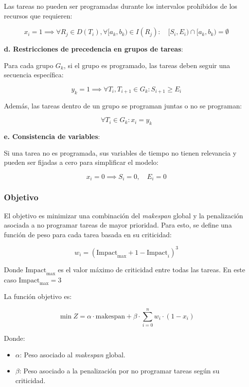 \documentclass{article}
\begin{document}
Las tareas no pueden ser programadas durante los intervalos prohibidos de los recursos que requieren:

\[
x_i = 1 \implies \forall R_j \in D(T_i), \forall [a_k, b_k) \in I(R_j): \quad [S_i, E_i) \cap [a_k, b_k) = \emptyset
\]

\textbf{d. Restricciones de precedencia en grupos de tareas}:

Para cada grupo \( G_k \), si el grupo es programado, las tareas deben seguir una secuencia específica:

\[
y_k = 1 \implies \forall T_i, T_{i+1} \in G_k: S_{i+1} \geq E_i
\]

Además, las tareas dentro de un grupo se programan juntas o no se programan:

\[
\forall T_i \in G_k: x_i = y_k
\]

\textbf{e. Consistencia de variables}:

Si una tarea no es programada, sus variables de tiempo no tienen relevancia y pueden ser fijadas a cero para simplificar el modelo:

\[
x_i = 0 \implies S_i = 0, \quad E_i = 0
\]

\vspace{0.5cm}

\subsubsection{Objetivo}

El objetivo es minimizar una combinación del \textit{makespan} global y la penalización asociada a no programar tareas de mayor prioridad. Para esto, se define una función de peso para cada tarea basada en su criticidad:

\[
w_i = (\text{Impact}_{\text{max}} + 1 - \text{Impact}_i)^3
\]

Donde \( \text{Impact}_{\text{max}} \) es el valor máximo de criticidad entre todas las tareas. En este caso \( \text{Impact}_{\text{max}} = 3 \)

La función objetivo es:

\[
\min Z = \alpha \cdot \text{makespan} + \beta \cdot \sum_{i=0}^{n} w_i \cdot (1 - x_i)
\]

Donde:

\begin{itemize}
    \item \( \alpha \): Peso asociado al \textit{makespan} global.
    \item \( \beta \): Peso asociado a la penalización por no programar tareas según su criticidad.
\end{itemize}
\end{document}
